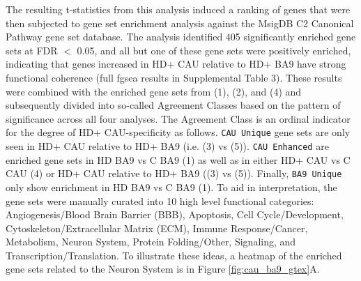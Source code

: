 \documentclass[fleqn,10pt,table]{wlscirep}
\begin{document}
The resulting t-statistics from this analysis induced a ranking of genes that were then subjected to gene set enrichment analysis against the MsigDB C2 Canonical Pathway gene set database.
The analysis identified 405 significantly enriched gene sets at FDR $<$ 0.05, and all but one of these gene sets were positively enriched, indicating that genes increased in HD+ CAU relative to HD+ BA9 have strong functional coherence (full fgsea results in Supplemental Table 3).
These results were combined with the enriched gene sets from (1), (2), and (4) and subsequently divided into so-called Agreement Classes based on the pattern of significance across all four analyses.
The Agreement Class is an ordinal indicator for the degree of HD+ CAU-specificity as follows.
\texttt{CAU Unique} gene sets are only seen in HD+ CAU relative to HD+ BA9 (i.e. (3) vs (5)).
\texttt{CAU Enhanced} are enriched gene sets in HD BA9 vs C BA9 (1) as well as in either HD+ CAU vs C CAU (4) or HD+ CAU relative to HD+ BA9 ((3) vs (5)).
Finally, \texttt{BA9 Unique} only show enrichment in HD BA9 vs C BA9 (1).
To aid in interpretation, the gene sets were manually curated into 10 high level functional categories: Angiogenesis/Blood Brain Barrier (BBB), Apoptosis, Cell Cycle/Development, Cytoskeleton/Extracellular Matrix (ECM), Immune Response/Cancer, Metabolism, Neuron System, Protein Folding/Other, Signaling, and Transcription/Translation.
To illustrate these ideas, a heatmap of the enriched gene sets related to the Neuron System is in Figure \ref{fig:cau_ba9_gtex}A.
\end{document}
